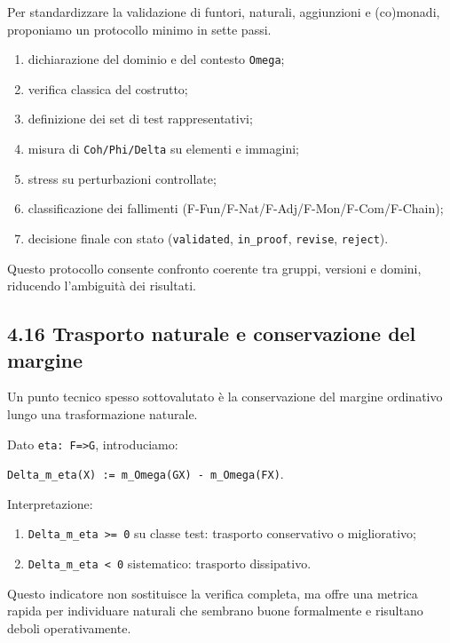Per standardizzare la validazione di funtori, naturali, aggiunzioni e (co)monadi, proponiamo un protocollo minimo in sette passi.

\begin{enumerate}
\def\labelenumi{\arabic{enumi}.}
\tightlist
\item
  dichiarazione del dominio e del contesto \texttt{Omega};
\item
  verifica classica del costrutto;
\item
  definizione dei set di test rappresentativi;
\item
  misura di \texttt{Coh/Phi/Delta} su elementi e immagini;
\item
  stress su perturbazioni controllate;
\item
  classificazione dei fallimenti (F-Fun/F-Nat/F-Adj/F-Mon/F-Com/F-Chain);
\item
  decisione finale con stato (\texttt{validated}, \texttt{in\_proof}, \texttt{revise}, \texttt{reject}).
\end{enumerate}

Questo protocollo consente confronto coerente tra gruppi, versioni e domini, riducendo l'ambiguità dei risultati.

\subsection{4.16 Trasporto naturale e conservazione del margine}

Un punto tecnico spesso sottovalutato è la conservazione del margine ordinativo lungo una trasformazione naturale.

Dato \texttt{eta:\ F=\textgreater{}G}, introduciamo:

\texttt{Delta\_m\_eta(X)\ :=\ m\_Omega(GX)\ -\ m\_Omega(FX)}.

Interpretazione:

\begin{enumerate}
\def\labelenumi{\arabic{enumi}.}
\tightlist
\item
  \texttt{Delta\_m\_eta\ \textgreater{}=\ 0} su classe test: trasporto conservativo o migliorativo;
\item
  \texttt{Delta\_m\_eta\ \textless{}\ 0} sistematico: trasporto dissipativo.
\end{enumerate}

Questo indicatore non sostituisce la verifica completa, ma offre una metrica rapida per individuare naturali che sembrano buone formalmente e risultano deboli operativamente.

